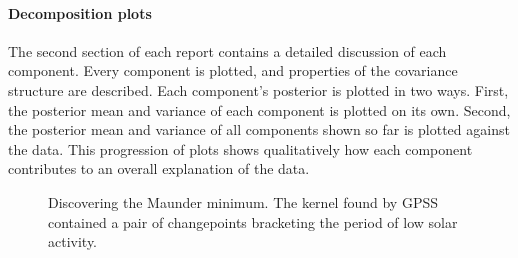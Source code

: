 \documentclass{article}
\begin{document}


\paragraph{Decomposition plots}

The second section of each report contains a detailed discussion of each component.
Every component is plotted, and properties of the covariance structure are described.
Each component's posterior is plotted in two ways.  First, the posterior mean and variance of each component is plotted on its own.  Second, the posterior mean and variance of all components shown so far is plotted against the data.  This progression of plots 
shows qualitatively how each component contributes to an overall explanation of the data.


\begin{figure}[ht]
\centering
{}
\caption{Discovering the Maunder minimum.  The kernel found by GPSS contained a pair of changepoints bracketing the period of low solar activity.}
\label{fig:maunder}
\end{figure}
\end{document}
